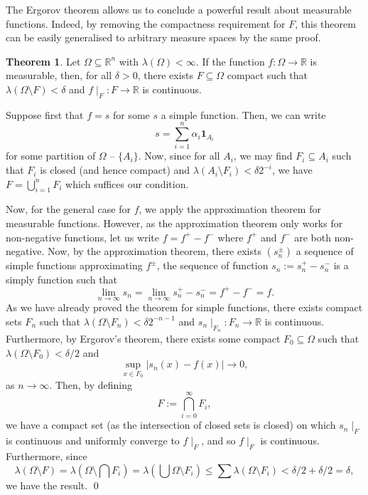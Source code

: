 \documentclass[
]{article}
\theoremstyle{definition}
\newtheorem{theorem}{Theorem}
\theoremstyle{definition}
\begin{document}
The Ergorov theorem allows us to conclude a powerful result about
measurable functions. Indeed, by removing the compactness requirement
for \(F\), this theorem can be easily generalised to arbitrary measure
spaces by the same proof.

\begin{theorem}
  Let \(\Omega \subseteq \mathbb{R}^n\) with \(\lambda(\Omega) < \infty\).  
  If the function \(f : \Omega \to \mathbb{R}\) is measurable, then, for all 
  \(\delta > 0\), there exists \(F \subseteq \Omega\) compact such that 
  \(\lambda(\Omega \setminus F) < \delta\) and \(f\mid_F : F \to \mathbb{R}\) 
  is continuous.
\end{theorem}
\proof

Suppose first that \(f = s\) for some \(s\) a simple function. Then, we
can write \[s = \sum_{i = 1}^n \alpha_i \mathbf{1}_{A_i}\] for some
partition of \(\Omega\) -- \(\{A_i\}\). Now, since for all \(A_i\), we
may find \(F_i \subseteq A_i\) such that \(F_i\) is closed (and hence
compact) and \(\lambda(A_i \setminus F_i) < \delta 2^{-i}\), we have
\(F = \bigcup_{i = 1}^n F_i\) which suffices our condition.

Now, for the general case for \(f\), we apply the approximation theorem
for measurable functions. However, as the approximation theorem only
works for non-negative functions, let us write \(f = f^+ - f^-\) where
\(f^+\) and \(f^-\) are both non-negative. Now, by the approximation
theorem, there exists \((s_n^\pm)\) a sequence of simple functions
approximating \(f^\pm\), the sequence of function
\(s_n := s_n^+ - s_n^-\) is a simply function such that
\[\lim_{n \to \infty} s_n = \lim_{n \to \infty} s_n^+ - s_n^- = f^+ - f^- = f.\]
As we have already proved the theorem for simple functions, there exists
compact sets \(F_n\) such that
\(\lambda(\Omega \setminus F_n) < \delta 2^{-n - 1}\) and
\(s_n\mid_{F_n} : F_n \to \mathbb{R}\) is continuous. Furthermore, by
Ergorov's theorem, there exists some compact \(F_0 \subseteq \Omega\)
such that \(\lambda(\Omega \setminus F_0) < \delta / 2\) and
\[\sup_{x \in F_0} |s_n(x) - f(x)| \to 0,\] as \(n \to \infty\). Then,
by defining \[F := \bigcap_{i = 0}^\infty F_i,\] we have a compact set
(as the intersection of closed sets is closed) on which \(s_n \mid_F\)
is continuous and uniformly converge to \(f\mid_F\), and so \(f\mid_F\)
is continuous. Furthermore, since
\[\lambda(\Omega \setminus F) = \lambda\left(\Omega \setminus \bigcap F_i\right)
    = \lambda\left(\bigcup \Omega \setminus F_i\right) 
    \le \sum \lambda(\Omega \setminus F_i) < \delta / 2 + \delta / 2 = \delta,\]
we have the result. \qed
\end{document}
